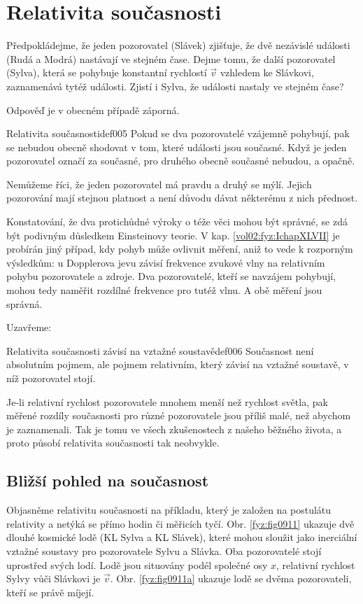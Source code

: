   \section{Relativita současnosti}
    Předpokládejme, že jeden pozorovatel (Slávek) zjišťuje, že dvě nezávislé události (Rudá a Modrá)
    nastávají ve stejném čase. Dejme tomu, že další pozorovatel (Sylva), která se pohybuje
    konstantní rychlostí \(\vec{v}\) vzhledem ke Slávkovi, zaznamenává tytéž události. Zjistí i
    Sylva, že události nastaly ve stejném čase?

    Odpověď je v obecném případě záporná.
    \begin{fyzdef}{Relativita současnosti}{def005}          
      Pokud se dva pozorovatelé vzájemně pohybují, pak se nebudou obecně shodovat v tom, které
      události jsou současné. Když je jeden pozorovatel označí za současné, pro druhého obecně
      současné nebudou, a opačně.
    \end{fyzdef}

    Nemůžeme říci, že jeden pozorovatel má pravdu a druhý se mýlí. Jejich pozorování mají stejnou
    platnost a není důvodu dávat některému z nich přednost.

    Konstatování, že dva protichůdné výroky o téže věci mohou být správné, se zdá být podivným
    důsledkem Einsteinovy teorie. V kap. \ref{vol02:fyz:IchapXLVII} je probírán jiný případ, kdy
    pohyb může ovlivnit měření, aniž to vede k rozporným výsledkům: u Dopplerova jevu závisí
    frekvence zvukové vlny na relativním pohybu pozorovatele a zdroje. Dva pozorovatelé, kteří se
    navzájem pohybují, mohou tedy naměřit rozdílné frekvence pro tutéž vlnu. A obě měření jsou
    správná.

    Uzavřeme:
    \begin{fyzdef}{Relativita současnosti závisí na vztažné soustavě}{def006}          
      Současnost není absolutním pojmem, ale pojmem relativním, který závisí na vztažné soustavě,
      v níž pozorovatel stojí.
    \end{fyzdef}

    Je-li relativní rychlost pozorovatele mnohem menší než rychlost světla, pak měřené rozdíly
    současnosti pro různé pozorovatele jsou příliš malé, než abychom je zaznamenali. Tak je tomu ve
    všech zkušenostech z našeho běžného života, a proto působí relativita současnosti tak neobvykle.

    \subsection{Bližší pohled na současnost}
      Objasněme relativitu současnosti na příkladu, který je založen na postulátu relativity a
      netýká se přímo hodin či měřicích tyčí. Obr. \ref{fyz:fig0911} ukazuje dvě dlouhé kosmické
      lodě (KL Sylva a KL Slávek), které mohou sloužit jako inerciální vztažné soustavy pro
      pozorovatele Sylvu a Slávka. Oba pozorovatelé stojí uprostřed svých lodí. Lodě jsou situovány
      podél společné osy \(x\), relativní rychlost Sylvy vůči Slávkovi je \(\vec{v}\). Obr.
      \ref{fyz:fig0911a} ukazuje lodě se dvěma pozorovateli, kteří se právě míjejí.

